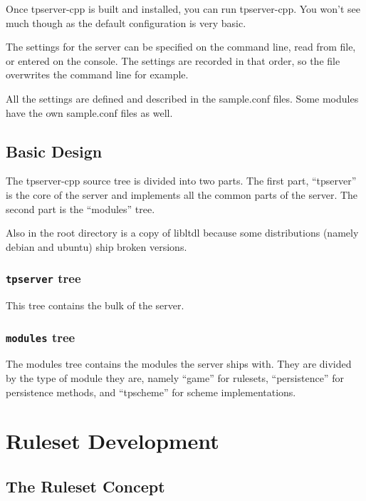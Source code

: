 \documentclass[a4paper,11pt]{report}
\begin{document}
Once tpserver-cpp is built and installed, you can run tpserver-cpp.  You won't see much though as the default configuration is very basic.

The settings for the server can be specified on the command line, read from file, or entered on the console. The settings are recorded in that order, so the file overwrites the command line for example.

All the settings are defined and described in the sample.conf files. Some modules have the own sample.conf files as well.

\chapter{Basic Design}
\label{chap:design-basic}

The tpserver-cpp source tree is divided into two parts. The first part, ``tpserver'' is the core of the server and implements all the common parts of the server. The second part is the ``modules'' tree.

Also in the root directory is a copy of libltdl because some distributions (namely debian and ubuntu) ship broken versions.

\section{\texttt{tpserver} tree}
\label{sec:tree-tpserver}

This tree contains the bulk of the server.

\section{\texttt{modules} tree}
\label{sec:tree-modules}

The modules tree contains the modules the server ships with. They are divided by the type of module they are, namely ``game'' for rulesets, ``persistence'' for persistence methods, and ``tpscheme'' for scheme implementations.

\part{Ruleset Development}
\label{part:ruleset-dev}

\chapter{The Ruleset Concept}
\label{chap:ruleset-concept}
\end{document}
